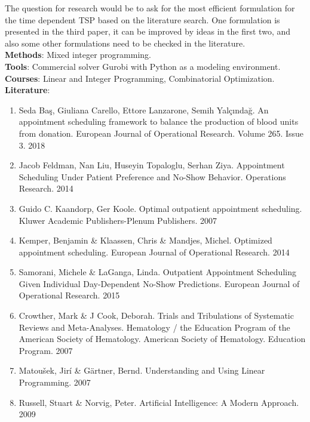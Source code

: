 \documentclass[a4paper,12pt]{article}
\begin{document}
The question for research would be to ask for the most efficient formulation for the time dependent TSP based on the literature search. One formulation is presented in the third paper, it can be improved by ideas in the first two, and also some other formulations need to be checked in the literature.\\

\textbf{Methods}: Mixed integer programming.\\

\textbf{Tools}: Commercial solver Gurobi with Python as a modeling environment.\\

\textbf{Courses}: Linear and Integer Programming, Combinatorial Optimization.\\


\textbf{Literature}:

\begin{enumerate}
    \item Seda Baş, Giuliana Carello, Ettore Lanzarone, Semih Yalçındağ. An appointment scheduling framework to balance the production of blood units from donation. European Journal of Operational Research. Volume 265. Issue 3. 2018

    \item Jacob Feldman, Nan Liu, Huseyin Topaloglu, Serhan Ziya. Appointment Scheduling Under Patient Preference and No-Show Behavior. Operations Research. 2014

    \item Guido C. Kaandorp, Ger Koole. Optimal outpatient appointment scheduling. Kluwer Academic Publishers-Plenum Publishers. 2007

    \item Kemper, Benjamin \& Klaassen, Chris \& Mandjes, Michel. Optimized appointment scheduling. European Journal of Operational Research. 2014

    \item Samorani, Michele \& LaGanga, Linda. Outpatient Appointment Scheduling Given Individual Day-Dependent No-Show Predictions. European Journal of Operational Research. 2015

    \item Crowther, Mark \& J Cook, Deborah. Trials and Tribulations of Systematic Reviews and Meta-Analyses. Hematology / the Education Program of the American Society of Hematology. American Society of Hematology. Education Program. 2007

    \item Matoušek, Jirí \& Gärtner, Bernd. Understanding and Using Linear Programming. 2007

    \item Russell, Stuart \& Norvig, Peter. Artificial Intelligence: A Modern Approach.  2009
\end{enumerate}
\end{document}
